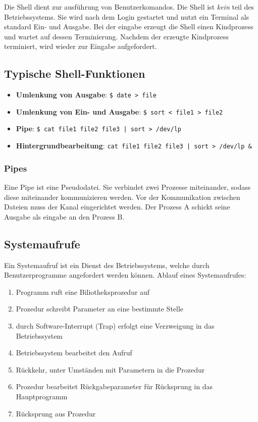 Die Shell dient zur ausführung von Benutzerkomandos. Die Shell ist \textit{kein} teil des Betriebssystems. Sie wird nach dem Login gestartet und nutzt ein Terminal als standard Ein- und Ausgabe. Bei der eingabe erzeugt die Shell einen Kindprozess und wartet auf dessen Terminierung. Nachdem der erzeugte Kindprozess terminiert, wird wieder zur Eingabe aufgefordert.

\subsection*{Typische Shell-Funktionen}

\begin{itemize}
    \item \textbf{Umlenkung von Ausgabe}: \texttt{\$ date > file}
    \item \textbf{Umlenkung von Ein- und Ausgabe}: \newline\texttt{\$ sort < file1 > file2}
    \item \textbf{Pipe}: \texttt{\$ cat file1 file2 file3 | sort > /dev/lp}
    \item \textbf{Hintergrundbearbeitung}: \newline\texttt{cat file1 file2 file3 | sort > /dev/lp \&}
\end{itemize}

\subsubsection{Pipes}

Eine Pipe ist eine Pseudodatei. Sie verbindet zwei Prozesse miteinander, sodass diese miteinander kommunizieren werden. Vor der Kommunikation zwischen Dateien muss der Kanal eingerichtet werden. Der Prozess A schickt seine Ausgabe als eingabe an den Prozess B.

\subsection{Systemaufrufe}

Ein Systemaufruf ist ein Dienst des Betriebssystems, welche durch Benutzerprogramme angefordert werden können. Ablauf eines Systemaufrufes:

\begin{enumerate}
    \item Programm ruft eine Biliotheksprozedur auf
    \item Prozedur schreibt Parameter an eine bestimmte Stelle
    \item durch Software-Interrupt (Trap) erfolgt eine Verzweigung in das Betriebssystem
    \item Betriebssystem bearbeitet den Aufruf
    \item Rückkehr, unter Umständen mit Parametern in die Prozedur
    \item Prozedur bearbeitet Rückgabeparameter für Rücksprung in das Hauptprogramm
    \item Rücksprung aus Prozedur
\end{enumerate}

